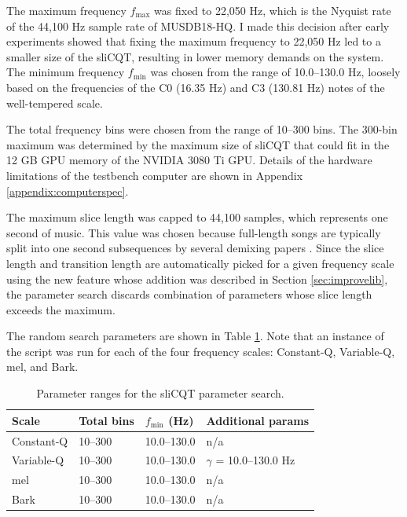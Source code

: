 \documentclass[report.tex]{subfiles}
\begin{document}
The maximum frequency $f_{\text{max}}$ was fixed to 22,050 Hz, which is the Nyquist rate of the 44,100 Hz sample rate of MUSDB18-HQ. I made this decision after early experiments showed that fixing the maximum frequency to 22,050 Hz led to a smaller size of the sliCQT, resulting in lower memory demands on the system. The minimum frequency $f_{\text{min}}$ was chosen from the range of 10.0--130.0 Hz, loosely based on the frequencies of the C0 (16.35 Hz) and C3 (130.81 Hz) notes of the well-tempered scale.

The total frequency bins were chosen from the range of 10--300 bins. The 300-bin maximum was determined by the maximum size of sliCQT that could fit in the 12 GB GPU memory of the NVIDIA 3080 Ti GPU. Details of the hardware limitations of the testbench computer are shown in Appendix \ref{appendix:computerspec}.

The maximum slice length was capped to 44,100 samples, which represents one second of music. This value was chosen because full-length songs are typically split into one second subsequences by several demixing papers \parencite{plumbley1, plumbley2, demucs}. Since the slice length and transition length are automatically picked for a given frequency scale using the new feature whose addition was described in Section \ref{sec:improvelib}, the parameter search discards combination of parameters whose slice length exceeds the maximum.

The random search parameters are shown in Table \ref{table:slicqparams}. Note that an instance of the script was run for each of the four frequency scales: Constant-Q, Variable-Q, mel, and Bark.

\begin{table}[ht]
	\centering
	\caption{Parameter ranges for the sliCQT parameter search.}
	\label{table:slicqparams}
\begin{tabular}{ |l|l|l|l| }
	 \hline
	 Scale & Total bins & $f_{\text{min}}$ (Hz) & Additional params \\
	 \hline
	 \hline
	 Constant-Q & 10--300 & 10.0--130.0 & n/a \\
	 \hline
	 Variable-Q & 10--300 & 10.0--130.0 & $\gamma$ = 10.0--130.0 Hz \\
	 \hline
	 mel & 10--300 & 10.0--130.0 & n/a \\
	 \hline
	 Bark & 10--300 & 10.0--130.0 & n/a \\
	 \hline
\end{tabular}
\end{table}
\end{document}
